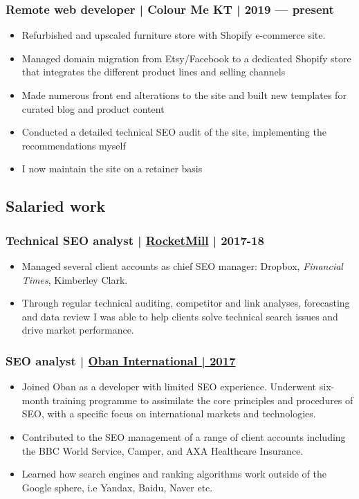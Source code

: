 \documentclass[11pt,a4paper]{article}
\begin{document}
\subsubsection*{Remote web developer | Colour Me KT | 2019 --- present }
\begin{itemize}
    \item Refurbished and upscaled furniture store with Shopify e-commerce site.
    \item Managed domain migration from Etsy/Facebook to a dedicated Shopify store that integrates the different product lines and selling channels
    \item Made numerous front end alterations to the site and built new templates for curated blog and product content
    \item Conducted a detailed technical SEO audit of the site, implementing the recommendations myself
    \item I now maintain the site on a retainer basis
\end{itemize}

\subsection*{Salaried work}

\subsubsection*{Technical SEO analyst | \href{https://www.rocketmill.co.uk/}{RocketMill} | 2017-18 }
\begin{itemize}
    \item Managed several client accounts as chief SEO manager: Dropbox, \emph{Financial Times}, Kimberley Clark.
    \item Through regular technical auditing, competitor and link analyses, forecasting and data review I was able to help clients solve technical search issues and drive market performance.
\end{itemize}

\subsubsection*{SEO analyst | \href{https://obaninternational.com/}{Oban International | 2017} }
\begin{itemize}
    \item Joined Oban as a developer with limited SEO experience. Underwent six-month training programme to assimilate the core principles and procedures of SEO, with a specific focus on international markets and technologies.
    \item Contributed to the SEO management of a range of client accounts including the BBC World Service, Camper, and AXA Healthcare Insurance.
    \item Learned how search engines and ranking algorithms work outside of the Google sphere, i.e Yandax, Baidu, Naver etc.
\end{itemize}
\end{document}
